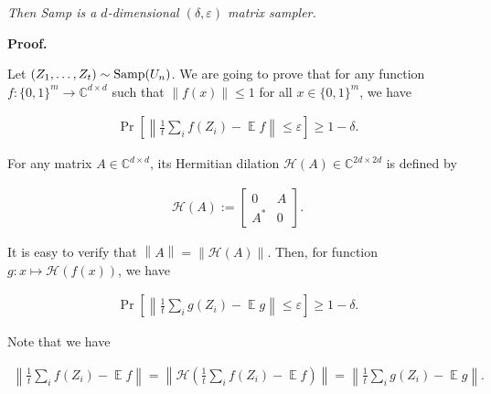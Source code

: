 \emph{Then Samp is a $d$-dimensional $(\delta,\varepsilon)$ matrix sampler.}\par






\par\medskip\noindent\textbf{Proof.}\par




Let $(Z_{1},\dots,Z_{t})\sim\textup{{Samp}}(U_{n})$.
We are going to prove that for any function $f:\{0,1\}^{m}\to\mathbb{C}^{d\times d}$ such that $\|f(x)\|\leq 1$ for all $x\in\{0,1\}^{m}$, we have\par


\[\begin{gathered}
\Pr\left[\left\lVert\frac{1}{t}\sum_{i}f(Z_{i})-\operatorname*{\mathbb{E}}f\right\rVert\leq\varepsilon\right]\geq 1-\delta.
\end{gathered}\]


For any matrix $A\in\mathbb{C}^{d\times d}$, its Hermitian dilation $\mathcal{H}(A)\in\mathbb{C}^{2d\times 2d}$ is defined by\par


\[\begin{gathered}
\mathcal{H}(A):=\begin{bmatrix}0&A\\
A^{*}&0\end{bmatrix}.
\end{gathered}\]


It is easy to verify that $\left\lVert A\right\rVert=\left\lVert\mathcal{H}(A)\right\rVert$. Then, for function $g:x\mapsto\mathcal{H}(f(x))$, we have\par


\[\begin{gathered}
\Pr\left[\left\lVert\frac{1}{t}\sum_{i}g(Z_{i})-\operatorname*{\mathbb{E}}g\right\rVert\leq\varepsilon\right]\geq 1-\delta.
\end{gathered}\]


Note that we have\par


\[\begin{gathered}
\left\lVert\frac{1}{t}\sum_{i}f(Z_{i})-\operatorname*{\mathbb{E}}f\right\rVert=\left\lVert\mathcal{H}\left(\frac{1}{t}\sum_{i}f(Z_{i})-\operatorname*{\mathbb{E}}f\right)\right\rVert=\left\lVert\frac{1}{t}\sum_{i}g(Z_{i})-\operatorname*{\mathbb{E}}g\right\rVert.
\end{gathered}\]


